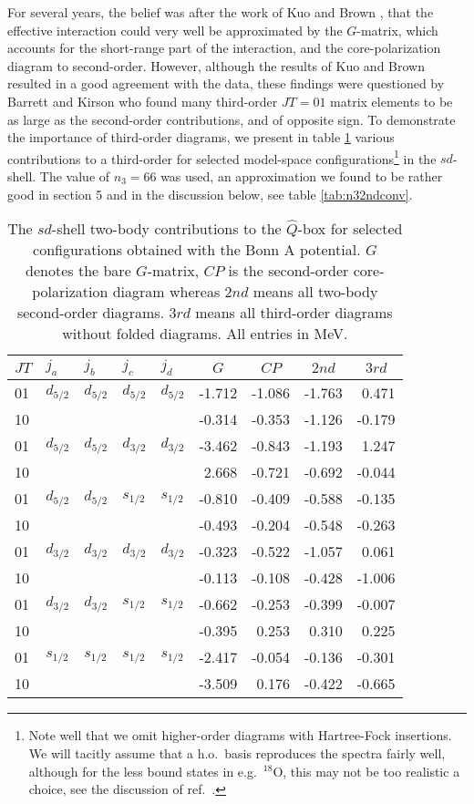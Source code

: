 For several years, the belief was after the work of
Kuo and Brown \cite{kb66}, that
the effective interaction could very well be approximated by
the $G$-matrix, which accounts for the short-range part
of the interaction, and the core-polarization diagram to second-order.
However, although the results of Kuo and Brown resulted
in a good agreement with the data, these findings were questioned
by Barrett and Kirson \cite{bk70}
who found many third-order
$JT=01$ matrix elements to be as large as the second-order contributions,
and of opposite sign.
To demonstrate the importance of third-order diagrams, we present in
table \ref{tab:sdmtxel} various contributions to a third-order
\qbox for selected model-space
configurations\footnote{Note well that we omit higher-order
diagrams with Hartree-Fock insertions. We will tacitly assume that
a h.o.\ basis reproduces the spectra fairly well, although
for the less bound states in e.g.\ $^{18}$O, this may not be too
realistic a choice, see the discussion of ref.\ \cite{eo77}.}
in the $sd$-shell. The value of $n_3=66$ was used,
an approximation we found
to be rather good in section 5 and in the discussion below, see
table \ref{tab:n32ndconv}.
\begin{table}[hbtp]
\caption{The $sd$-shell two-body contributions to the $\hat{Q}$-box
for selected configurations
obtained with the Bonn A potential.
$G$ denotes the bare $G$-matrix, $CP$
is the second-order core-polarization diagram
whereas $2nd$ means all two-body second-order diagrams.
$3rd$ means all third-order diagrams without folded diagrams.
All entries in MeV.}
\begin{center}
\begin{tabular}{lllllrrrr}
\hline
$JT$&$j_{a}$&$j_{b}$&$j_{c}$&$j_{d}$&
\multicolumn{1}{c}{$G$}&
\multicolumn{1}{c}{$CP$}&
\multicolumn{1}{c}{$2nd$}&
\multicolumn{1}{c}{$3rd$}\\ \hline
01&$d_{5/2}$&$d_{5/2}$&$d_{5/2}$&$d_{5/2}$&-1.712&-1.086&-1.763&0.471\\
10&&&&&-0.314&-0.353&-1.126&-0.179\\
01&$d_{5/2}$&$d_{5/2}$&$d_{3/2}$&$d_{3/2}$&-3.462&-0.843&-1.193&1.247\\
10&&&&&2.668&-0.721&-0.692&-0.044\\
01&$d_{5/2}$&$d_{5/2}$&$s_{1/2}$&$s_{1/2}$&-0.810&-0.409&-0.588&-0.135\\
10&&&&&-0.493&-0.204&-0.548&-0.263\\
01&$d_{3/2}$&$d_{3/2}$&$d_{3/2}$&$d_{3/2}$&-0.323&-0.522&-1.057&0.061\\
10&&&&&-0.113&-0.108&-0.428&-1.006\\
01&$d_{3/2}$&$d_{3/2}$&$s_{1/2}$&$s_{1/2}$&-0.662&-0.253&-0.399&-0.007\\
10&&&&&-0.395&0.253&0.310&0.225\\
01&$s_{1/2}$&$s_{1/2}$&$s_{1/2}$&$s_{1/2}$&-2.417&-0.054&-0.136&-0.301\\
10&&&&&-3.509&0.176&-0.422&-0.665\\ \hline
\end{tabular}
\end{center}
\label{tab:sdmtxel}
\end{table}
